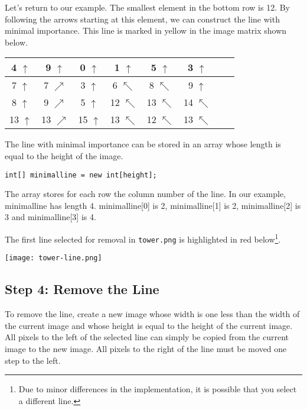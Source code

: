 \documentclass{article}
\newcommand{\co}[1]{#1}
\begin{document}
Let's return to our example. The smallest element in the bottom row is 12. By following the arrows starting at this element, we can construct the line with minimal importance. This line is marked in yellow in the image matrix shown below.

\begin{center}
\begin{tabular}{| c | c | c | c | c | c | c | c |}
\hline
4 $\uparrow$ & 9 $\uparrow$ & 0 $\uparrow$\cellcolor{yellow} & 1 $\uparrow$ & 5 $\uparrow$ & 3 $\uparrow$\\
\hline
7 $\uparrow$ & 7 $\nearrow$   & 3 $\uparrow$\cellcolor{yellow}  & 6 $\nwarrow$  & 8 $\nwarrow$  & 9 $\uparrow$\\
\hline
8 $\uparrow$  & 9 $\nearrow$  & 5 $\uparrow$  & 12 $\nwarrow$\cellcolor{yellow}  & 13 $\nwarrow$  & 14 $\nwarrow$ \\
\hline
13 $\uparrow$  & 13 $\nearrow$  & 15 $\uparrow$  & 13 $\nwarrow$  & 12 $\nwarrow$\cellcolor{yellow}  & 13 $\nwarrow$ \\
\hline
\end{tabular}
\end{center}

The line with minimal importance can be stored in an array whose length is equal to the height of the image.
\begin{lstlisting}
int[] minimalline = new int[height];
\end{lstlisting}
The array stores for each row the column number of the line. In our example, \co{minimalline} has length 4. \co{minimalline[0]} is 2, \co{minimalline[1]} is 2, \co{minimalline[2]} is 3 and \co{minimalline[3]} is 4.

The first line selected for removal in \texttt{tower.png} is highlighted in red below\footnote{Due to minor differences in the implementation, it is possible that you select a different line.}.
\begin{center}
\texttt{[image: tower-line.png]}
\end{center}

\subsection*{Step 4: Remove the Line}
To remove the line, create a new image whose width is one less than the width of the current image and whose height is equal to the height of the current image. All pixels to the left of the selected line can simply be copied from the current image to the new image. All pixels to the right of the line must be moved one step to the left.
\end{document}
